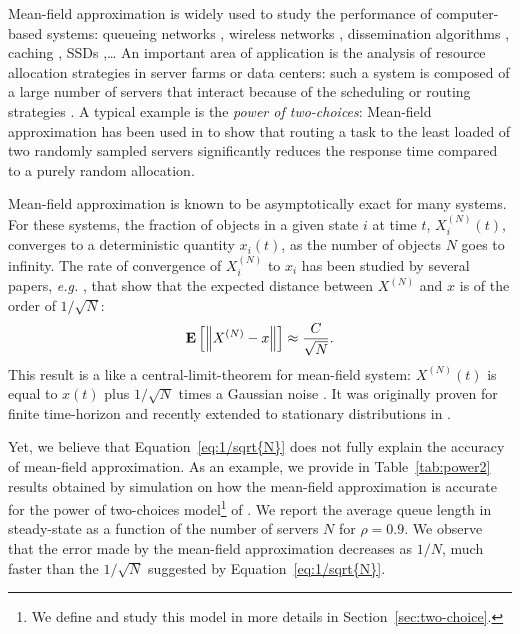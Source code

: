 \documentclass[sigconf]{acmart}
\newcommand\XN{X^{(N)}}
\newcommand\esp[1]{\mathbf{E}\left[#1\right]}
\newcommand\norm[1]{\left\|#1\right\|}
\begin{document}
Mean-field approximation is widely used to study the performance of
computer-based systems: queueing networks \cite{baccelli1992mean},
wireless networks \cite{cecchi2015mean}, dissemination algorithms
\cite{chaintreau2009age}, caching \cite{gast2015transient}, SSDs
\cite{van2013mean},\dots{}
An important area of application is the analysis of resource
allocation strategies in server farms or data centers: such a system
is composed of a large number of servers that interact because of the
scheduling or routing strategies
\cite{gast2010mean,lu2011join,mitzenmacher1996power,tsitsiklis2011power,vvedenskaya1996queueing}.
A typical example is the \emph{power of two-choices}: Mean-field
approximation has been used in
\cite{mitzenmacher1996power,vvedenskaya1996queueing} to show that
routing a task to the least loaded of two randomly sampled servers
significantly reduces  the response time compared to a purely random
allocation.

Mean-field approximation is known to be asymptotically exact for many
systems. For these systems, the fraction of objects in a given state
$i$ at time $t$, $\XN_i(t)$, converges to a deterministic quantity
$x_i(t)$, as the number of objects $N$ goes to infinity.  The rate of
convergence of $\XN_i$ to $x_i$ has been studied by several papers,
\emph{e.g.}  \cite{benaim2008class,kurtz70,ying2016rate}, that show
that the expected distance between $\XN$ and $x$ is of the order of
$1/\sqrt{N}$:
\begin{align}
  \label{eq:1/sqrt{N}}
  \esp{\norm{\XN-x}} \approx \frac{C}{\sqrt{N}}.
\end{align}
This result is a like a central-limit-theorem for mean-field system:
$\XN(t)$ is equal to $x(t)$ plus $1/\sqrt{N}$ times a Gaussian noise
\cite{kurtz70}. It was originally proven for finite time-horizon and
recently extended to stationary distributions in \cite{ying2016rate}.


Yet, we believe that Equation~\eqref{eq:1/sqrt{N}} does not fully
explain the accuracy of mean-field approximation. As an example, we
provide in Table~\ref{tab:power2} results obtained by simulation on
how the mean-field approximation is accurate for the power of
two-choices model\footnote{We define and study this model in more
  details in Section~\ref{sec:two-choice}.} of
\cite{mitzenmacher1996power,vvedenskaya1996queueing}. We report the
average queue length in steady-state as a function of the number of
servers $N$ for $\rho=0.9$. We observe that the error made by the
mean-field approximation decreases as $1/N$, much faster than the
$1/\sqrt{N}$ suggested by Equation~\eqref{eq:1/sqrt{N}}.
\end{document}
